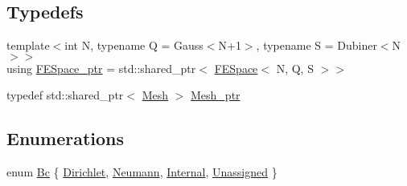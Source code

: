\subsection*{Typedefs}
\begin{DoxyCompactItemize}
\item 
{\footnotesize template$<$int N, typename Q  = Gauss$<$\-N+1$>$, typename S  = Dubiner$<$\-N$>$$>$ }\\using \hyperlink{namespaceTspeed_a05fcb57094666c8f5ab1e90d1a6fecf8}{F\-E\-Space\-\_\-ptr} = std\-::shared\-\_\-ptr$<$ \hyperlink{classTspeed_1_1FESpace}{F\-E\-Space}$<$ N, Q, S $>$$>$
\item 
typedef std\-::shared\-\_\-ptr$<$ \hyperlink{classTspeed_1_1Mesh}{Mesh} $>$ \hyperlink{namespaceTspeed_a7367a01365c4cc2c1a09305b3effc4e8}{Mesh\-\_\-ptr}
\end{DoxyCompactItemize}
\subsection*{Enumerations}
\begin{DoxyCompactItemize}
\item 
enum \hyperlink{namespaceTspeed_a301e5218199485c06d62434c719ea5e0}{Bc} \{ \hyperlink{namespaceTspeed_a301e5218199485c06d62434c719ea5e0abac152b762896edff34ed668ae1a546f}{Dirichlet}, 
\hyperlink{namespaceTspeed_a301e5218199485c06d62434c719ea5e0ab8537a769dbc90cb1762215441212152}{Neumann}, 
\hyperlink{namespaceTspeed_a301e5218199485c06d62434c719ea5e0aafbf0897a5a83fdd873dfb032ec695d3}{Internal}, 
\hyperlink{namespaceTspeed_a301e5218199485c06d62434c719ea5e0a3476bf9c3af766198bfbd4f065a51e69}{Unassigned}
 \}
\end{DoxyCompactItemize}
